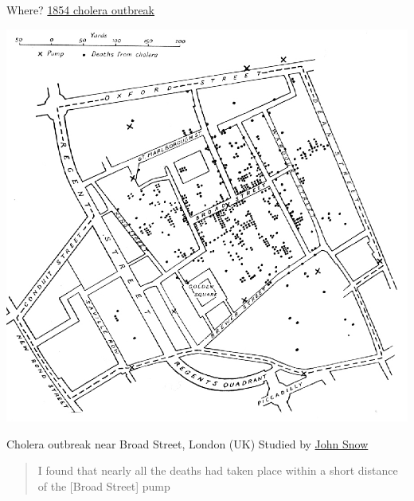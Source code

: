 \documentclass[aspectratio=43]{beamer}
\begin{document}
\begin{frame}{Where? \href{https://en.wikipedia.org/wiki/1854_Broad_Street_cholera_outbreak}{1854 cholera outbreak}}
    \begin{minipage}{0.5\textwidth}
    \includegraphics[width=\textwidth]{../FIGS/Snow-cholera-map.jpg}
    \end{minipage}
    \begin{minipage}{0.45\textwidth}
        Cholera outbreak near Broad Street, London (UK)
        \vfill
        Studied by \href{https://en.wikipedia.org/wiki/John_Snow}{John Snow}

        \begin{quotation}
            I found that nearly all the deaths had taken place within a short distance of the [Broad Street] pump    
        \end{quotation}
            \end{minipage}
\end{frame}
\end{document}
